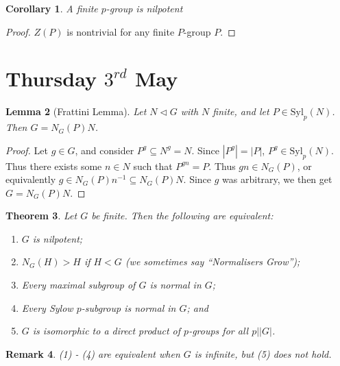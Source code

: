 \documentclass[a4paper,10pt]{article}
\newtheorem{thm}{Theorem}
\newtheorem{Cor}[thm]{Corollary}
\newtheorem{Lem}[thm]{Lemma}
\newtheorem{rem}[thm]{Remark}
\begin{document}
\begin{Cor}
A finite $p$-group is nilpotent
\end{Cor}
\begin{proof}
$Z(P)$ is nontrivial for any finite $P$-group $P$. 
\end{proof}







\newpage
\section{Thursday $3^{rd}$ May}

\begin{Lem}[Frattini Lemma]
Let $ N \triangleleft G$ with $N$ finite, and let $P \in \text{Syl}_p(N)$. Then $G = N_G(P) N$.
\end{Lem}
\begin{proof}
Let $g \in G$, and consider $P^g \subseteq N^g = N$. Since $|P^g| = |P|$, $P^g \in \text{Syl}_p(N)$. Thus there exists some $n \in N$ such that $P^{gn} = P$.  Thus $gn \in N_G(P)$, or equivalently $g \in N_G(P) n^{-1} \subseteq N_G(P)N$. Since $g$ was arbitrary, we then get $G =  N_G(P)N$.
\end{proof}


\begin{thm}
Let $G$ be finite. Then the following are equivalent:

\begin{enumerate}
\item $G$ is nilpotent;
\item $N_G(H) > H$ if $H < G$ (we sometimes say ``Normalisers Grow''); 
\item Every maximal subgroup of $G$ is normal in $G$;
\item Every Sylow $p$-subgroup is normal in $G$; and
\item $G$ is isomorphic to a direct product of $p$-groups for all $p \big| |G|$.
\end{enumerate}

\end{thm}

\begin{rem}
(1) - (4) are equivalent when $G$ is infinite, but (5) does not hold. 
\end{rem}
\end{document}
